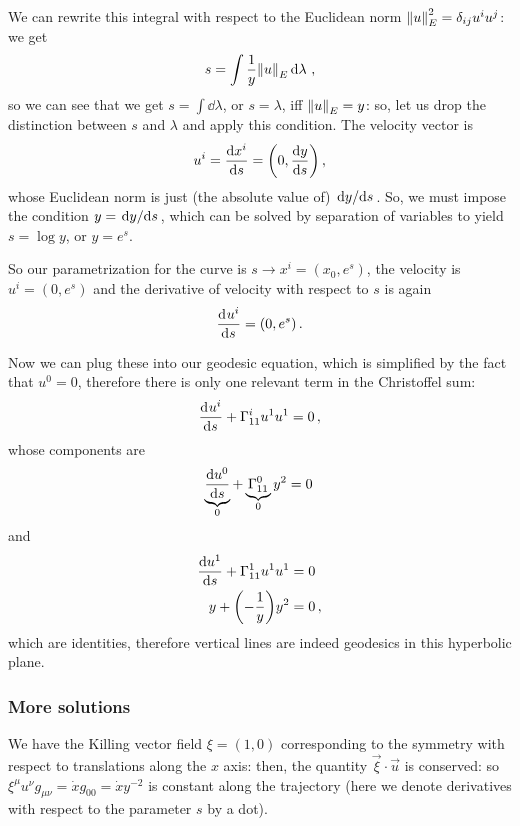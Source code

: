 \documentclass[main.tex]{subfiles}
\begin{document}
We can rewrite this integral with respect to the Euclidean norm \(\norm{u}_E^2 = \delta_{ij} u^{i} u^{j}\): we get 
%
\begin{align}
  s = \int \frac{1}{y} \norm{u}_E \dd{\lambda }
\,,
\end{align}
%
so we can see that we get \(s = \int \dd{\lambda }\), or \(s = \lambda \), iff \(\norm{u}_E = y\): so, let us drop the distinction between \(s\) and \(\lambda \) and apply this condition.
The velocity vector is 
%
\begin{align}
  u^{i} = \dv{x^{i}}{s} = \qty(0, \dv{y}{s})
\,,
\end{align}
%
whose Euclidean norm is just (the absolute value of) \(\dv*{y}{s}\). 
So, we must impose the condition \(y = \dv*{y}{s}\), which can be solved by separation of variables to yield \(s = \log y\), or \(y = e^{s}\). 

So our parametrization for the curve is \(s \rightarrow x^{i} = (x_0, e^{s})\), the velocity is \(u^{i} = (0, e^{s})\) and the derivative of velocity with respect to \(s\) is again 
%
\begin{align}
  \dv[]{u^{i}}{s} = (0, e^{s})
\,.
\end{align}

Now we can plug these into our geodesic equation, which is simplified by the fact that \(u^{0} = 0\), therefore there is only one relevant term in the Christoffel sum: 
%
\begin{align}
  \dv[]{ u^{i}}{s} + \Gamma^{i}_{11} u^{1} u^{1} = 0
\,,
\end{align}
%
whose components are 
%
\begin{align}
  \underbrace{\dv{ u^{0}}{s}}_{0} + \underbrace{\Gamma^{0}_{11}}_{0} y^2 = 0
\,
\end{align}
%
and 
%
\begin{subequations}
  \begin{align}
    \dv{ u^{1}}{s} + \Gamma^{1}_{11} u^{1} u^{1} &= 0  \\
    y + \qty(- \frac{1}{y}) y^2 &=0
    \,,
  \end{align}
\end{subequations}
%
which are identities, therefore vertical lines are indeed geodesics in this hyperbolic plane.

\subsubsection{More solutions}

We have the Killing vector field \(\xi = (1,0)\) corresponding to the symmetry with respect to translations along the \(x\) axis: then, the quantity \(\vec{\xi} \cdot \vec{u}\) is conserved: so \(\xi^{\mu } u^{\nu } g_{\mu \nu }=\dot{x} g_{00} = \dot{x} y^{-2}\) is constant along the trajectory (here we denote derivatives with respect to the parameter \(s\) by a dot).
\end{document}
